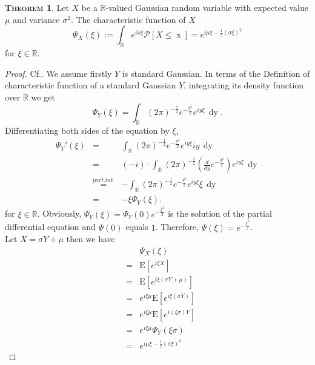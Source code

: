 \documentclass[a4paper, twoside, 11pt]{article}
\theoremstyle{definition}
\newtheorem{theorem}[definition]{\scshape Theorem}
\newcommand{\sqbr}[1]{\left[ {#1} \right]}
\begin{document}
  \begin{theorem}
	Let $X$ be a $\mathbb{R}$-valued Gaussian random variable with expected value $\mu$ and variance $\sigma^2$. The characteristic function of $X$
  \begin{equation}
	\Psi_X(\xi) := \int_\mathbb{R} e^{ix\xi}\mathcal{P}\sqbr{X \le \mathop{x}} = e^{i\mu\xi-\frac{1}{2}(\sigma\xi)^2}
	\label{sec:cht}
  \end{equation}
  for $\xi \in \mathbb{R}$.
  \label{sec:char}
  \end{theorem}
  \begin{proof}
	Cf.\cite{shilling}. We assume firstly $Y$ is standard Gaussian. In terms of the Definition of characteristic function of a standard Gaussian $Y$, integrating its density function over $\mathbb{R}$ we get
	\begin{equation*}
	  \Psi_Y(\xi) = \int_\mathbb{R} (2\pi)^{-\frac{1}{2}}e^{-\frac{y^2}{2}}e^{iy\xi}\,\mathop{dy}.
	\end{equation*} 
  Differentiating both sides of the equation by $\xi$,
  \begin{eqnarray*}
  \Psi_Y'(\xi) &=& \int_\mathbb{R}(2\pi)^{-\frac{1}{2}}e^{-\frac{y^2}{2}}e^{iy\xi}iy\,\mathop{dy}\\
			   &=& (-i)\cdot\int_\mathbb{R} (2\pi)^{-\frac{1}{2}}(\frac{d}{dy}e^{-\frac{y^2}{2}})e^{iy\xi}\,\mathop{dy}\\
			   &\overset{part.int.}{=}& -\int_\mathbb{R}(2\pi)^{-\frac{1}{2}}e^{-\frac{y^2}{2}}e^{iy\xi}\xi\,\mathop{dy}\\
			   &=& -\xi\Psi_Y(\xi).
  \end{eqnarray*}
  for $\xi \in \mathbb{R}$. Obviously, 
  $\Psi_Y(\xi) = \Psi_Y(0)e^{-\frac{\xi^2}{2}}$ is the solution of the partial differential equation and $\Psi(0)$ equals $1$. Therefore, $\Psi(\xi) = e^{-\frac{\xi^2}{2}}$.\\
  Let $X =\sigma Y + \mu$ then we have
  \begin{eqnarray*}
	&& \Psi_X(\xi)\\
	&=& \mathrm{E}[e^{i\xi X}]\\
	&=& \mathrm{E}[e^{i\xi (\sigma Y + \mu) }]\\
	&=& e^{i\xi\mu} \mathrm{E}[e^{i\xi (\sigma Y)}]\\
	&=& e^{i\xi\mu} \mathrm{E}[e^{i (\xi \sigma) Y}]\\
	&=& e^{i\xi\mu} \Psi_Y(\xi\sigma)\\
	&=& e^{i\mu\xi-\frac{1}{2}(\sigma\xi)^2}
  \end{eqnarray*}
  \end{proof}
\end{document}
